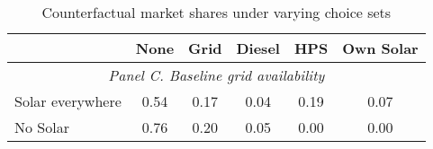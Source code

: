 \begin{table}[htbp]\centering
\caption{Counterfactual market shares under varying choice sets\label{tab:counterfactual}}
\begin{tabular}{l*{5}{c}}
\toprule
            &        None&        Grid&      Diesel&         HPS&   Own Solar\\
\midrule

\multicolumn{6}{c}{\emph{Panel C. Baseline grid availability}}\\
Solar everywhere&     \cellcolor{yellow}   0.54&        0.17&        0.04&       \cellcolor{yellow} 0.19&  \cellcolor{yellow}      0.07\\
No Solar    &    \cellcolor{yellow}    0.76&        0.20&        0.05&       \cellcolor{yellow} 0.00&    \cellcolor{yellow}    0.00\\

\bottomrule
\end{tabular}
\end{table}
